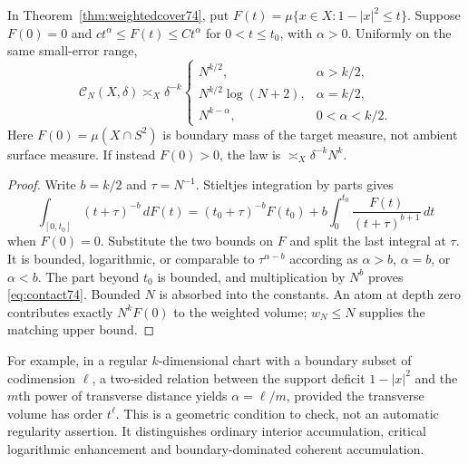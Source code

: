 \begin{corollary}\label{cor:contact74}
In Theorem~\ref{thm:weightedcover74}, put
$F(t)=\mu\{x\in X:1-|x|^2\le t\}$. Suppose $F(0)=0$ and
$c t^\alpha\le F(t)\le C t^\alpha$ for $0<t\le t_0$, with
$\alpha>0$. Uniformly on the same small-error range,
\begin{equation}\label{eq:contact74}
 \mathcal C_N(X,\delta)\asymp_X\delta^{-k}
 \begin{cases}
 N^{k/2},&\alpha>k/2,\\
 N^{k/2}\log(N+2),&\alpha=k/2,\\
 N^{k-\alpha},&0<\alpha<k/2.
 \end{cases}
\end{equation}
Here $F(0)=\mu(X\cap S^2)$ is boundary mass of the target measure,
not ambient surface measure. If instead $F(0)>0$, the law is $\asymp_X\delta^{-k}N^k$.
\end{corollary}
\begin{proof}
Write $b=k/2$ and $\tau=N^{-1}$. Stieltjes integration by parts gives
\[
 \int_{[0,t_0]}(t+\tau)^{-b}\,dF(t)
 =(t_0+\tau)^{-b}F(t_0)
       +b\int_0^{t_0}\frac{F(t)}{(t+\tau)^{b+1}}\,dt
\]
when $F(0)=0$. Substitute the two bounds on $F$ and split the last
integral at $\tau$. It is bounded, logarithmic, or comparable to
$\tau^{\alpha-b}$ according as $\alpha>b$, $\alpha=b$, or
$\alpha<b$. The part beyond $t_0$ is bounded, and multiplication by
$N^b$ proves \eqref{eq:contact74}. Bounded $N$ is absorbed into the
constants. An atom at depth zero contributes exactly $N^kF(0)$ to
the weighted volume; $w_N\le N$ supplies the matching upper bound.
\end{proof}
For example, in a regular $k$-dimensional chart with a boundary subset
of codimension $\ell$, a two-sided relation between the support deficit
$1-|x|^2$ and the $m$th power of transverse distance yields
$\alpha=\ell/m$, provided the transverse volume has order $t^\ell$.
This is a geometric condition to check, not an automatic regularity
assertion. It distinguishes ordinary interior accumulation, critical
logarithmic enhancement and boundary-dominated coherent accumulation.

